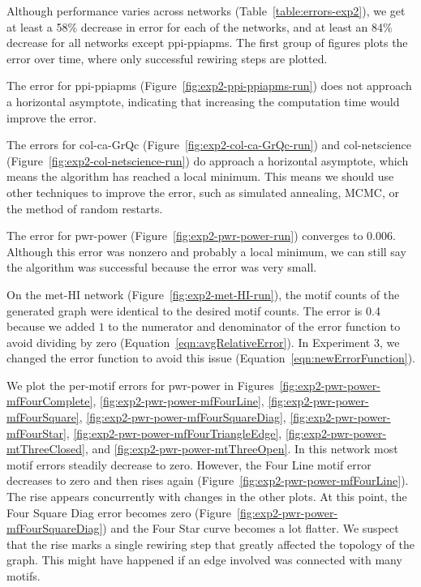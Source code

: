 Although performance varies across networks (Table~\ref{table:errors-exp2}), 
we get at least a 58\% decrease in error for each of the networks, and at 
least an 84\% decrease for all networks except ppi-ppiapms.  The first
group of figures plots the error over time, where only successful rewiring
steps are plotted.

The error for ppi-ppiapms (Figure~\ref{fig:exp2-ppi-ppiapms-run}) does not
approach a horizontal asymptote, indicating that increasing the
computation time would improve the error.

The errors for col-ca-GrQc (Figure~\ref{fig:exp2-col-ca-GrQc-run}) and
col-netscience (Figure~\ref{fig:exp2-col-netscience-run}) do approach a
horizontal asymptote, which means the algorithm has reached a
local minimum.  This means we should use other techniques to improve
the error, such as simulated annealing, MCMC, or the method of random
restarts.

The error for pwr-power (Figure~\ref{fig:exp2-pwr-power-run}) converges to 
0.006.  Although this error was nonzero and probably a local minimum, we 
can still say the algorithm was successful because the error was very small.

On the met-HI network (Figure~\ref{fig:exp2-met-HI-run}), the motif 
counts of the generated graph were identical to the
desired motif counts.  The error is 0.4 because we added $1$ to the
numerator and denominator of the error function to avoid dividing by zero
(Equation~\ref{eqn:avgRelativeError}).  In Experiment 3, we changed the
error function to avoid this issue (Equation~\ref{eqn:newErrorFunction}).

  We plot the per-motif errors for pwr-power
in Figures~\ref{fig:exp2-pwr-power-mfFourComplete},
\ref{fig:exp2-pwr-power-mfFourLine},
\ref{fig:exp2-pwr-power-mfFourSquare},
\ref{fig:exp2-pwr-power-mfFourSquareDiag},
\ref{fig:exp2-pwr-power-mfFourStar},
\ref{fig:exp2-pwr-power-mfFourTriangleEdge},
\ref{fig:exp2-pwr-power-mtThreeClosed}, and
\ref{fig:exp2-pwr-power-mtThreeOpen}.
In this network most motif errors steadily decrease to zero.  However, the
Four Line motif error decreases to zero and then rises again
(Figure~\ref{fig:exp2-pwr-power-mfFourLine}).  The rise
appears concurrently with changes in the other plots.  At this point,
the Four Square Diag error becomes zero
(Figure~\ref{fig:exp2-pwr-power-mfFourSquareDiag}) and the Four Star curve
becomes a lot flatter.  We suspect that the rise marks a single rewiring
step that greatly affected the topology of the graph.  This might have 
happened if an edge involved was connected with many motifs.

